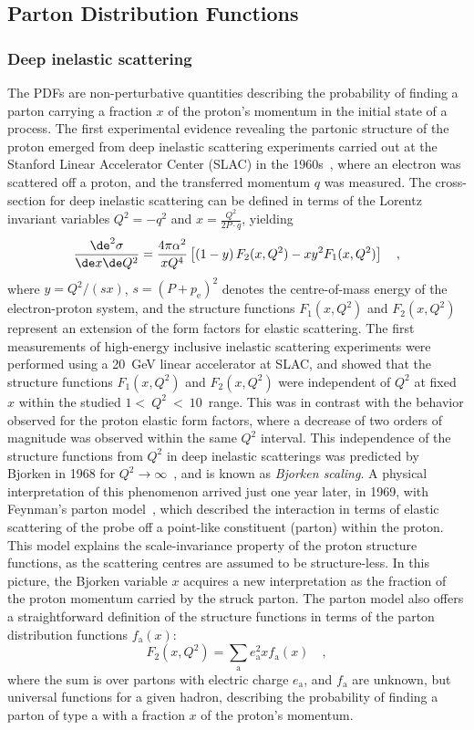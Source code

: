 \subsection{Parton Distribution Functions}
\subsubsection{Deep inelastic scattering}
The PDFs are non-perturbative quantities describing the probability of finding a parton carrying a fraction $x$ of the proton's momentum in the initial state of a process. The first experimental evidence revealing the partonic structure of the proton emerged from deep inelastic scattering experiments carried out at the Stanford Linear Accelerator Center (SLAC) in the 1960s~\cite{Friedman:1972sy}, where an electron was scattered off a proton, and the transferred momentum $q$ was measured. The cross-section for deep inelastic scattering can be defined in terms of the Lorentz invariant variables $Q^2 = -q^2$ and $x = \frac{Q^2}{2P\cdot q}$, yielding
\begin{equation*}
    \frac{\de^2\sigma}{\de x \de Q^2} = \frac{4\pi\alpha^2}{xQ^4} \left[ \left(1-y\right)F_2(x,Q^2) - xy^2F_1(x,Q^2) \right]\quad ,
\end{equation*}
where $y=Q^2/(sx)$, $s = (P+p_\mathrm{e})^2$ denotes the centre-of-mass energy of the electron-proton system, and the structure functions $F_1(x,Q^2)$ and $F_2(x,Q^2)$ represent an extension of the form factors for elastic scattering.
The first measurements of high-energy inclusive inelastic scattering experiments were performed using a 20~GeV linear accelerator at SLAC, and showed that the structure functions $F_1(x,Q^2)$ and $F_2(x,Q^2)$ were independent of $Q^2$ at fixed $x$ within the studied $1<~Q^2~<~10$~\gevcc range. This was in contrast with the behavior observed for the proton elastic form factors, where a decrease of two orders of magnitude was observed within the same $Q^2$ interval. This independence of the structure functions from $Q^2$ in deep inelastic scatterings was predicted by Bjorken in 1968 for $Q^2 \rightarrow \infty$~\cite{Bjorken:1968dy}, and is known as \emph{Bjorken scaling}. A physical interpretation of this phenomenon arrived just one year later, in 1969, with Feynman's parton model~\cite{Feynman:1969ej}, which described the interaction in terms of elastic scattering of the probe off a point-like constituent (parton) within the proton. This model explains the scale-invariance property of the proton structure functions, as the scattering centres are assumed to be structure-less. In this picture, the Bjorken variable $x$ acquires a new interpretation as the fraction of the proton momentum carried by the struck parton. The parton model also offers a straightforward definition of the structure functions in terms of the parton distribution functions $f_\mathrm{a}(x)$:
\begin{equation*}
    F_2(x,Q^2) = \sum_\mathrm{a} e_\mathrm{a}^2 x f_\mathrm{a}(x)\quad ,
\end{equation*}
where the sum is over partons with electric charge $e_\mathrm{a}$, and $f_\mathrm{a}$ are unknown, but universal functions for a given hadron, describing the probability of finding a parton of type a with a fraction $x$ of the proton's momentum. 

